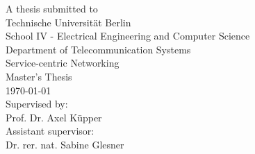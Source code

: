 \begin{titlepage}
\begin{center}
		\vspace{2cm}
	 	A thesis submitted to\\
	 	\vspace{0.5cm}
		Technische Universität Berlin\\
		School IV - Electrical Engineering and Computer Science\\
		Department of Telecommunication Systems\\
		Service-centric Networking\\
		\vspace{0.5cm}
		Master's Thesis\\
		\vspace{2.2cm}
		\today\\
		\vspace{2.0cm}
		\large
		Supervised by:\\
		Prof. Dr. Axel Küpper\\
		\vspace{1cm}
		Assistant supervisor:\\
		Dr. rer. nat. Sabine Glesner
		\end{center}
\end{titlepage}

\shipout\null
\shipout\null
